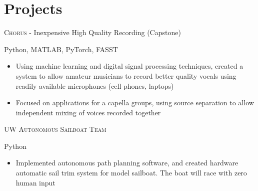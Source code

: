 \documentclass[letterpaper,10pt]{article}
\begin{document}
\begin{minipage}[t]{0.6\textwidth}
\section{Projects}
\smallskip
\begin{large}
\textsc{Chorus} - Inexpensive High Quality Recording (Capstone) \\
\end{large}
\begin{footnotesize}
Python, MATLAB, PyTorch, FASST
\end{footnotesize}
\smallskip
\begin{itemize}
	\item {Using machine learning and digital signal processing techniques, created a system to allow amateur musicians to record better quality vocals using readily available microphones (cell phones, laptops)}
    \item {Focused on applications for a capella groups, using source separation to allow independent mixing of voices recorded together}
\end{itemize}

\bigskip

\begin{large}
\textsc{UW Autonomous Sailboat Team}\\
\end{large}
\begin{footnotesize}
Python
\end{footnotesize}
\smallskip
\begin{itemize}
	\item {Implemented autonomous path planning software, and created hardware automatic sail trim system for model sailboat. The boat will race with zero human input}
\end{itemize}


\end{minipage}
\hfill
\end{document}
